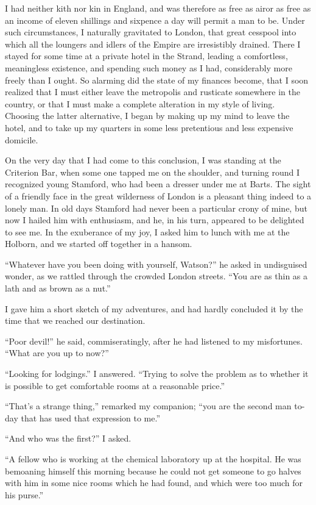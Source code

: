 \documentclass[12pt,english]{book}
\begin{document}
I had neither kith nor kin in England, and was therefore as free as
air\mdsh{---}or as free as an income of eleven shillings and sixpence
a day will permit a man to be. Under such circumstances, I naturally
gravitated to London, that great cesspool into which all the loungers
and idlers of the Empire are irresistibly drained. There I stayed
for some time at a private hotel in the Strand, leading a comfortless,
meaningless existence, and spending such money as I had, considerably
more freely than I ought. So alarming did the state of my finances
become, that I soon realized that I must either leave the metropolis
and rusticate somewhere in the country, or that I must make a complete
alteration in my style of living. Choosing the latter alternative,
I began by making up my mind to leave the hotel, and to take up my
quarters in some less pretentious and less expensive domicile.

On the very day that I had come to this conclusion, I was standing
at the Criterion Bar, when some one tapped me on the shoulder, and
turning round I recognized young Stamford, who had been a dresser
under me at Barts. The sight of a friendly face in the great wilderness
of London is a pleasant thing indeed to a lonely man. In old days
Stamford had never been a particular crony of mine, but now I hailed
him with enthusiasm, and he, in his turn, appeared to be delighted
to see me. In the exuberance of my joy, I asked him to lunch with
me at the Holborn, and we started off together in a hansom.

{}``Whatever have you been doing with yourself, Watson?'' he asked
in undisguised wonder, as we rattled through the crowded London streets.
{}``You are as thin as a lath and as brown as a nut.''

I gave him a short sketch of my adventures, and had hardly concluded
it by the time that we reached our destination.

{}``Poor devil!'' he said, commiseratingly, after he had listened
to my misfortunes. {}``What are you up to now?''

{}``Looking for lodgings.'' I answered. {}``Trying to solve the
problem as to whether it is possible to get comfortable rooms at a
reasonable price.''

{}``That's a strange thing,'' remarked my companion; {}``you are
the second man to-day that has used that expression to me.''

{}``And who was the first?'' I asked.

{}``A fellow who is working at the chemical laboratory up at the
hospital. He was bemoaning himself this morning because he could not
get someone to go halves with him in some nice rooms which he had
found, and which were too much for his purse.''
\end{document}
